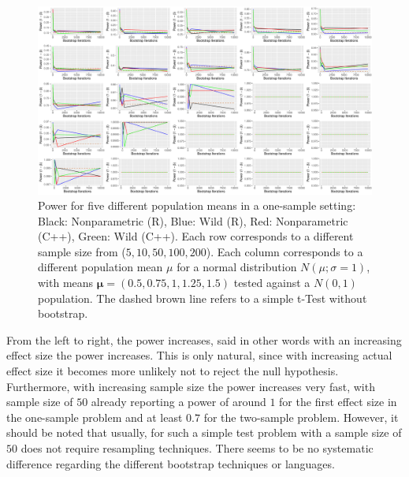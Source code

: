 \begin{figure}
\centering
	\includegraphics[scale=0.4]{./figures/plot_t2s2.pdf}
	\caption[Power Two Sample]{Power for five different population means in a one-sample setting: Black: Nonparametric (R), Blue: Wild (R), Red: Nonparametric (C++), Green: Wild (C++). Each row corresponds to a different sample size from ($5, 10, 50, 100, 200$). Each column corresponds to a different population mean $\mu$ for a normal distribution $N(\mu; \sigma = 1)$, with means $\mathbf{\mu} = (0.5, 0.75, 1, 1.25, 1.5)$ tested against a $N(0,1)$ population. The dashed brown line refers to a simple t-Test without bootstrap.}
	\label{fig:t2_s2}
\end{figure}

\noindent From the left to right, the power increases, said in other words with an increasing effect size the power increases. This is only natural, since with increasing actual effect size it becomes more unlikely not to reject the null hypothesis. Furthermore, with increasing sample size the power increases very fast, with sample size of $50$ already reporting a power of around $1$ for the first effect size in the one-sample problem and at least $0.7$ for the two-sample problem. However, it should be noted that usually, for such a simple test problem with a sample size of $50$ does not require resampling techniques. There seems to be no systematic difference regarding the different bootstrap techniques or languages.